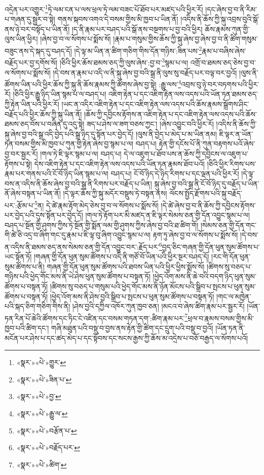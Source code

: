 འདྲེན་པར་འགྱུར་\footnote{«སྣར་»«པེ་»གྱུར་}ཏེ་ལམ་ངན་པ་ལས་ཕྲལ་ཏེ་ལམ་བཟང་པོ་ཐོབ་པར་མཛད་པའི་ཕྱིར་རོ། །དང་ཞེས་བྱ་བ་ནི་རིམ་པ་གཞན་དུ་སྦྱར་བ་སྟེ། གནས་སྐབས་འགའ་དེ་བསམ་གྱིས་མི་ཁྱབ་པ་ཡིན་ནོ། །འདིས་ནི་ཆོས་ཀྱི་སྐུ་འབྲས་བུའི་སྒོ་ནས་ཉེ་བར་བསྟོད་པ་ཡིན་ནོ། །ད་ནི་རྣམ་པར་བཤད་པའི་སྒོ་ནས་བསྔགས་པ་བྱ་བའི་ཕྱིར། ཆོས་རྣམས་ཀུན་གྱི་ལུས་ཡིན་ཕྱིར། །ཞེས་བྱ་བ་ལ་སོགས་པ་སྨོས་སོ། །རྣམ་པ་གསུམ་གྱིས་ཆོས་ཀྱི་སྐུ་ཞེས་བྱ་ཞེས་བྱ་བ་ནི་ཚིག་གསུམ་བཟུང་ནས་དེ་སྐད་དུ་བཤད་དོ། །དེ་ལྟ་མ་ཡིན་ན་ཚིག་གཅིག་གིས་དོན་གཉིས་:ཟིན་པས་\footnote{«སྣར་»«པེ་»ཟིན་པ་}རྣམ་པ་བཞིས་ཞེས་བརྗོད་པར་བྱ་དགོས་སོ། །ཅིའི་ཕྱིར་ཆོས་ཐམས་ཅད་ཀྱི་ལུས་ཞེས་:བྱ་བ་\footnote{«སྣར་»«པེ་»བྱ་}སྙམ་པ་ལ། འགྲོ་བ་ཐམས་ཅད་ཅེས་བྱ་བ་ལ་སོགས་པ་སྨོས་སོ། །དེ་བས་ན་རྣམ་པ་འདི་ལ་ནི་སྐུ་ཞེས་བྱ་བའི་སྒྲ་ནི་ལུས་སུ་བརྗོད་པར་བལྟ་བར་བྱའོ། །ལུས་ནི་ཚོགས་ཡིན་པའི་ཕྱིར་ཆོས་ཀྱི་སྐུ་ནི་ཆོས་རྣམས་ཀྱི་ཚོགས་ཞེས་བྱ་སྟེ། :རྒྱུ་ལས་\footnote{«སྣར་»«པེ་»རྒྱུ་ལ་}འབྲས་བུ་ཉེ་བར་བཏགས་པའི་ཕྱིར་རོ། །ཅིའི་ཕྱིར་རྒྱུ་ཉིད་ཡིན་སྙམ་པ་ལ་བཤད་པ། འཇིག་རྟེན་པ་དང་འཇིག་རྟེན་ལས་འདས་པའི་ཡོན་ཏན་ཐམས་ཅད་ཀྱི་རྟེན་ཡིན་པའི་ཕྱིར་རོ། །ཡང་ན་འདིར་འཇིག་རྟེན་པ་དང་འཇིག་རྟེན་ལས་འདས་པའི་ཆོས་རྣམས་སྒྲོགས་ཤིང་བརྗོད་པའི་ཕྱིར་ཆོས་ཀྱི་སྐུ་ཡིན་ནོ། །ཆོས་ཀྱི་དབྱིངས་རྟོགས་ན་འཇིག་རྟེན་པ་དང་འཇིག་རྟེན་ལས་འདས་པའི་ཆོས་ཐམས་ཅད་བོས་པ་བཞིན་དུ་འདུ་སྟེ། ཟད་པ་ཤེས་ལ་ཟག་བཅས་ཀྱང་། །ཞེས་འབྱུང་བའི་ཕྱིར་རོ། །འདིས་ནི་ཆོས་ཀྱི་སྐུ་ཞེས་བྱ་བའི་སྒྲ་འདི་བྱེད་པའི་སྒྲ་ཉིད་དུ་སྟོན་པར་བྱེད་དོ། །ལུས་ནི་བྱེད་པ་མེད་པ་མ་ཡིན་ནམ། ཇི་ལྟར་ན་ཡོན་ཏན་བསམ་གྱིས་མི་ཁྱབ་པ་ཀུན་གྱི་རྟེན་ཞེས་བྱ་སྙམ་པ་ལ། བཤད་པ། རྟེན་གྱི་དངོས་པོ་ནི་ཀུན་བརྟགས་པའོ་ཞེས་བྱ་བར་སྦྱར་རོ། །གལ་ཏེ་ཇི་ལྟར་སྙམ་པ་ལ། བཤད་པ། དེ་ལ་འཇུག་པ་ཐོབ་པས་ན་ཆོས་ཀྱི་དབྱིངས་ལ་འཇུག་པ་རྟོགས་པ་སྟེ། དེས་འཇིག་རྟེན་པ་དང་འཇིག་རྟེན་ལས་འདས་པའི་ཡོན་ཏན་རྣམས་ཐོབ་པའོ། །ཅིའི་ཕྱིར་རིགས་པས་རྣམ་པར་གནས་པའི་ངོ་བོ་ཉིད་ཡིན་སྙམ་པ་ལ། བཤད་པ། ངོ་བོ་ཉིད་དེ་ཉིད་རིགས་པ་དང་ལྡན་པའི་ཕྱིར་རོ། །དེ་ལྟ་བས་ན་འདིས་ནི་ཆོས་ཞེས་བྱ་བའི་སྒྲ་ནི་རིགས་པར་བརྗོད་པ་ཡིན། སྐུ་ཞེས་བྱ་བའི་སྒྲ་ནི་ངོ་བོ་ཉིད་དུ་བརྗོད་པ་ཡིན་ནོ་ཞེས་བསྟན་པ་ཡིན་ནོ། །དེ་ལྟར་ཆོས་ཀྱི་སྐུ་མདོར་བསྡུས་ཏེ་བསྟན་ནས། ལོངས་སྤྱོད་རྫོགས་པའི་སྐུ་བརྗོད་པར་:རྩོམ་པ་\footnote{«སྣར་»«པེ་»བརྩོན་པ་}ན། དེ་ཚེ་རྣམ་རྟོག་མེད་ཅེས་བྱ་བ་ལ་སོགས་པ་སྨོས་སོ། །དེ་ཚེ་ཞེས་བྱ་བ་ནི་ཆོས་ཀྱི་དབྱིངས་རྟོགས་པར་བྱེད་པའི་དུས་སྟོན་པར་བྱེད་དོ། །གལ་ཏེ་རྟོག་པར་མི་མཛད་ན་ཇི་ལྟར་སེམས་ཅན་གྱི་དོན་འབྱུང་སྙམ་པ་ལ། བཤད་པ་སྔོན་གྱི་ཤུགས་ཀྱིས་ཏེ་སྔོན་གྱི་སྨོན་ལམ་གྱི་ཤུགས་ཀྱིས་ཞེས་བྱ་བའི་ཐ་ཚིག་གོ། །སེམས་ཅན་གྱི་དོན་གང་གི་ཚེ་ཅི་འདྲ་བ་ཞིག་གང་དུ་རྣམ་པ་ཇི་ལྟ་བུ་ཞིག་འབྱུང་སྙམ་པ་ལ། རྟག་ཏུ་ཞེས་བྱ་བ་ལ་སོགས་པ་སྨོས་སོ། །དེ་བས་ན་འདིས་ནི་ཐམས་ཅད་ནས་སེམས་ཅན་གྱི་དོན་འབྱུང་བར་:རྗོད་པར་\footnote{«སྣར་»«པེ་»བརྗོད་པར་}བྱད་ཅིང་གཞན་གྱི་དོན་ཕུན་སུམ་ཚོགས་པ་ཡང་སྟོན་ཏོ། །གཞན་གྱི་དོན་ཕུན་སུམ་ཚོགས་པ་འདི་ནི་གཙོ་བོ་ཡིན་པའི་ཕྱིར་སྔར་བཤད་དོ། །རང་གི་དོན་ཕུན་སུམ་ཚོགས་པ་ནི། གཞན་གྱི་དོན་ཕུན་སུམ་ཚོགས་པའི་ཐབས་ཡིན་པའི་ཕྱིར་ཕྱིས་སྨོས་སོ། །ཚིགས་སུ་བཅད་པ་གཉིས་པའི་ཕྱེད་གོང་མས་ནི་ཡེ་ཤེས་ཕུན་སུམ་ཚོགས་པ་བསྟན་ཏོ། །ཕྱེད་འོག་མས་ནི་ཆེ་བའི་བདག་ཉིད་ཕུན་སུམ་ཚོགས་པ་བསྟན་ཏོ། །ཚིགས་སུ་བཅད་པ་གསུམ་པའི་ཕྱེད་གོང་མས་ནི་ཉོན་མོངས་པའི་སྒྲིབ་པ་སྤངས་པ་ཕུན་སུམ་ཚོགས་པ་བསྟན་ཏོ། །ཕྱེད་འོག་མས་ནི་ཤེས་བྱའི་སྒྲིབ་པ་སྤངས་པ་ཕུན་སུམ་ཚོགས་པ་བསྟན་ཏོ། །གང་ལ་མཁྱེན་པའི་སྐད་ཅིག་གཅིག་གིས་ནི། །ཤེས་བྱའི་དཀྱིལ་འཁོར་ཀུན་ཁྱབ་ཅན། །མངའ་བ་ཞེས་ཚིག་རྣམ་པར་སྦྱར་རོ། །ཡོན་ཏན་རིན་པོ་ཆེའི་ཚོགས་དང་ཏིང་ངེ་འཛིན་དང་བསམ་གཏན་དག་:ཚིག་རྣམ་པར་\footnote{«སྣར་»«པེ་»ཚིག་}ཕྲལ་བ་རྣམས་བསམ་གྱིས་མི་ཁྱབ་པའི་ཚིག་དང་། གཞི་མཐུན་པའི་བསྡུ་བ་བྱས་ནས་རྟེན་གྱི་ཚིག་དང་དྲུག་པའི་བསྡུ་བ་བྱའོ། །ཡོན་ཏན་ནི་མངོན་པར་ཤེས་པ་དང་ཚད་མེད་པ་དང་སྟོབས་དང་སངས་རྒྱས་ཀྱི་ཆོས་མ་འདྲེས་པ་བཅོ་བརྒྱད་ལ་སོགས་པའོ། 